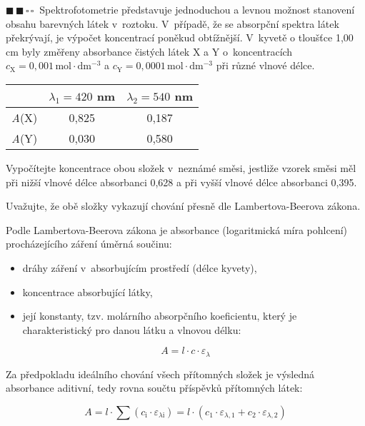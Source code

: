\documentclass{book}
\newcommand{\dva}{$\blacksquare \, \blacksquare \, \square \, \square \; \; $}
\renewenvironment{quotation}{\par}{\par} %
\begin{document}
\newpage %
\begin{quotation}
\dva Spektrofotometrie představuje jednoduchou a levnou možnost stanovení
obsahu barevných látek v~roztoku. V~případě, že se absorpční spektra
látek překrývají, je výpočet koncentrací poněkud obtížnější. V~kyvetě
o tloušťce 1,00 cm byly změřeny absorbance čistých látek X a Y o~koncentracích
\textit{$c_{\mathrm{X}}=0,001\,\mathrm{mol\cdot dm^{-3}}$} a $c_{\mathrm{Y}}=0,0001\,\mathrm{mol}\cdot\mathrm{dm^{-3}}$
při různé vlnové délce. 
\begin{center}
\begin{tabular}{c|c|c}

 & $\lambda_{1}=420$ nm & $\lambda_{2}=540$ nm\tabularnewline
\hline 
\textit{A}(X) & 0,825 & 0,187\tabularnewline
\hline 
\textit{A}(Y) & 0,030 & 0,580\tabularnewline

\end{tabular}
\par\end{center}
Vypočítejte koncentrace obou složek v~neznámé směsi, jestliže vzorek
směsi měl při nižší vlnové délce absorbanci 0,628 a při vyšší vlnové
délce absorbanci 0,395.

Uvažujte, že obě složky vykazují chování přesně dle Lambertova-Beerova
zákona. 
\end{quotation} \dotfill \par 
Podle Lambertova-Beerova zákona je absorbance (logaritmická míra pohlcení)
procházejícího záření úměrná součinu:
\begin{itemize}
\item dráhy záření v~absorbujícím prostředí (délce kyvety),
\item koncentrace absorbující látky,
\item její konstanty, tzv. molárního absorpčního koeficientu, který je
charakteristický pro danou látku a vlnovou délku:
\end{itemize}
\[
A=l\cdot c\cdot\varepsilon_{\lambda}
\]

Za předpokladu ideálního chování všech přítomných složek je výsledná
absorbance aditivní, tedy rovna součtu příspěvků přítomných látek:

\[
A=l\cdot\sum\left(c_{\mathrm{i}}\cdot\varepsilon_{\lambda \mathrm{i}}\right)=l\cdot(c_{1}\cdot\varepsilon_{\lambda,1}+c_{2}\cdot\varepsilon_{\lambda,2})
\]
\end{document}
